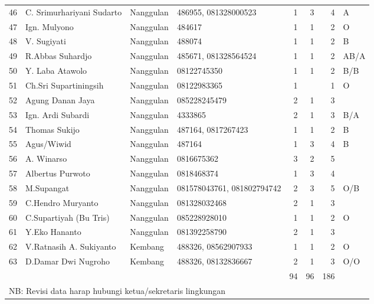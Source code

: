 \documentclass[a5paper,titlepage,11pt]{book}
\begin{document}
\begin{tabular}{|r|l|l|p{1.7cm}|r|r|r|p{0.7cm}|}
46	&C. Srimurhariyani Sudarto	&Nanggulan 	&486955, 081328000523	&1	&3	&4	&A\\
47	&Ign. Mulyono	&Nanggulan 	&484617	&1	&1	&2	&O\\
48	&V. Sugiyati	&Nanggulan 	&488074	&1	&1	&2	&B\\
49	&R.Abbas Suhardjo	&Nanggulan 	&485671, 081328564524	&1	&1	&2	&AB/A\\
50	&Y. Laba Atawolo	&Nanggulan 	&08122745350	&1	&1	&2	&B/B\\
51	&Ch.Sri Supartiningsih	&Nanggulan 	&08122983365	&1	&	&1	&O\\
52	&Agung Danan Jaya	&Nanggulan 	&085228245479	&2	&1	&3	&\\
53	&Ign. Ardi Subardi	&Nanggulan 	&4333865	&2	&1	&3	&B/A\\
54	&Thomas Sukijo	&Nanggulan 	&487164, 0817267423	&1	&1	&2	&B\\
55	&Agus/Wiwid	&Nanggulan 	&487164	&1	&3	&4	&B\\
56	&A. Winarso	&Nanggulan 	&0816675362	&3	&2	&5	&\\
57	&Albertus Purwoto	&Nanggulan 	&0818468374	&1	&3	&4	&\\
58	&M.Supangat	&Nanggulan 	&081578043761, 081802794742	&2	&3	&5	&O/B\\
59	&C.Hendro Muryanto	&Nanggulan 	&081328032468	&2	&1	&3	&\\
60	&C.Supartiyah (Bu Tris)	&Nanggulan 	&085228928010	&1	&1	&2	&O\\
61	&Y.Eko Hananto	&Nanggulan 	&081392258790	&2	&1	&3	&\\
62	&V.Ratnasih A. Sukiyanto	&Kembang	&488326, 08562907933	&1	&1	&2	&O\\
63	&D.Damar Dwi Nugroho	&Kembang	&488326, 08132836667	&2	&1	&3	&O/O\\ \hline
	&	&	&	&94	&96	&186	&\\ \hline
	\multicolumn{7}{l}{NB: Revisi data harap hubungi ketua/sekretaris lingkungan}\\

\end{tabular}
\end{document}
